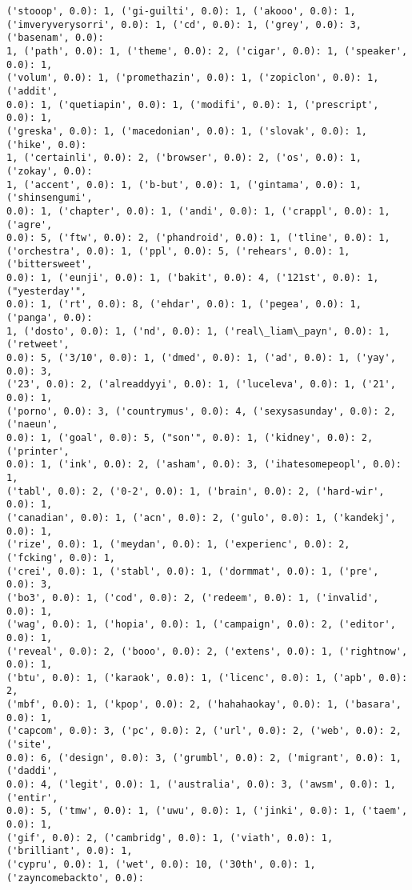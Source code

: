 \documentclass[11pt]{article}
\begin{document}
\begin{Verbatim}[commandchars=\\\{\}]
('stooop', 0.0): 1, ('gi-guilti', 0.0): 1, ('akooo', 0.0): 1,
('imveryverysorri', 0.0): 1, ('cd', 0.0): 1, ('grey', 0.0): 3, ('basenam', 0.0):
1, ('path', 0.0): 1, ('theme', 0.0): 2, ('cigar', 0.0): 1, ('speaker', 0.0): 1,
('volum', 0.0): 1, ('promethazin', 0.0): 1, ('zopiclon', 0.0): 1, ('addit',
0.0): 1, ('quetiapin', 0.0): 1, ('modifi', 0.0): 1, ('prescript', 0.0): 1,
('greska', 0.0): 1, ('macedonian', 0.0): 1, ('slovak', 0.0): 1, ('hike', 0.0):
1, ('certainli', 0.0): 2, ('browser', 0.0): 2, ('os', 0.0): 1, ('zokay', 0.0):
1, ('accent', 0.0): 1, ('b-but', 0.0): 1, ('gintama', 0.0): 1, ('shinsengumi',
0.0): 1, ('chapter', 0.0): 1, ('andi', 0.0): 1, ('crappl', 0.0): 1, ('agre',
0.0): 5, ('ftw', 0.0): 2, ('phandroid', 0.0): 1, ('tline', 0.0): 1,
('orchestra', 0.0): 1, ('ppl', 0.0): 5, ('rehears', 0.0): 1, ('bittersweet',
0.0): 1, ('eunji', 0.0): 1, ('bakit', 0.0): 4, ('121st', 0.0): 1, ("yesterday'",
0.0): 1, ('rt', 0.0): 8, ('ehdar', 0.0): 1, ('pegea', 0.0): 1, ('panga', 0.0):
1, ('dosto', 0.0): 1, ('nd', 0.0): 1, ('real\_liam\_payn', 0.0): 1, ('retweet',
0.0): 5, ('3/10', 0.0): 1, ('dmed', 0.0): 1, ('ad', 0.0): 1, ('yay', 0.0): 3,
('23', 0.0): 2, ('alreaddyyi', 0.0): 1, ('luceleva', 0.0): 1, ('21', 0.0): 1,
('porno', 0.0): 3, ('countrymus', 0.0): 4, ('sexysasunday', 0.0): 2, ('naeun',
0.0): 1, ('goal', 0.0): 5, ("son'", 0.0): 1, ('kidney', 0.0): 2, ('printer',
0.0): 1, ('ink', 0.0): 2, ('asham', 0.0): 3, ('ihatesomepeopl', 0.0): 1,
('tabl', 0.0): 2, ('0-2', 0.0): 1, ('brain', 0.0): 2, ('hard-wir', 0.0): 1,
('canadian', 0.0): 1, ('acn', 0.0): 2, ('gulo', 0.0): 1, ('kandekj', 0.0): 1,
('rize', 0.0): 1, ('meydan', 0.0): 1, ('experienc', 0.0): 2, ('fcking', 0.0): 1,
('crei', 0.0): 1, ('stabl', 0.0): 1, ('dormmat', 0.0): 1, ('pre', 0.0): 3,
('bo3', 0.0): 1, ('cod', 0.0): 2, ('redeem', 0.0): 1, ('invalid', 0.0): 1,
('wag', 0.0): 1, ('hopia', 0.0): 1, ('campaign', 0.0): 2, ('editor', 0.0): 1,
('reveal', 0.0): 2, ('booo', 0.0): 2, ('extens', 0.0): 1, ('rightnow', 0.0): 1,
('btu', 0.0): 1, ('karaok', 0.0): 1, ('licenc', 0.0): 1, ('apb', 0.0): 2,
('mbf', 0.0): 1, ('kpop', 0.0): 2, ('hahahaokay', 0.0): 1, ('basara', 0.0): 1,
('capcom', 0.0): 3, ('pc', 0.0): 2, ('url', 0.0): 2, ('web', 0.0): 2, ('site',
0.0): 6, ('design', 0.0): 3, ('grumbl', 0.0): 2, ('migrant', 0.0): 1, ('daddi',
0.0): 4, ('legit', 0.0): 1, ('australia', 0.0): 3, ('awsm', 0.0): 1, ('entir',
0.0): 5, ('tmw', 0.0): 1, ('uwu', 0.0): 1, ('jinki', 0.0): 1, ('taem', 0.0): 1,
('gif', 0.0): 2, ('cambridg', 0.0): 1, ('viath', 0.0): 1, ('brilliant', 0.0): 1,
('cypru', 0.0): 1, ('wet', 0.0): 10, ('30th', 0.0): 1, ('zayncomebackto', 0.0):

\end{Verbatim}
\end{document}
